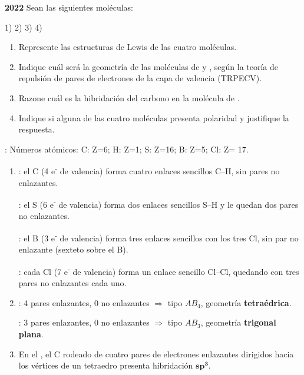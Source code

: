 \begin{exerciseEVAU}
    \textbf{2022}
    Sean las siguientes moléculas:
    \begin{center}
        1)  2)  3)  4) 
    \end{center}
    \begin{enumerate}[label=\letraminuscula]
        \item Represente las estructuras de Lewis de las cuatro moléculas.
        \item Indique cuál será la geometría de las moléculas de  y , según la teoría de repulsión
        de pares de electrones de la capa de valencia (TRPECV).
        \item Razone cuál es la hibridación del carbono en la molécula de .
        \item Indique si alguna de las cuatro moléculas presenta polaridad y justifique la respuesta.
    \end{enumerate}

    \datos{}: Números atómicos: C: Z=6; H: Z=1; S: Z=16; B: Z=5; Cl: Z= 17.

    \begin{solu}
        \begin{enumerate}[label=\letraminuscula]
            \item \textbf{}: el C (4 e\textsuperscript{-} de valencia) forma cuatro enlaces sencillos C--H, sin pares no enlazantes.

            \textbf{}: el S (6 e\textsuperscript{-} de valencia) forma dos enlaces sencillos S--H y le quedan dos pares no enlazantes.

            \textbf{}: el B (3 e\textsuperscript{-} de valencia) forma tres enlaces sencillos con los tres Cl, sin par no enlazante (sexteto sobre el B).

            \textbf{}: cada Cl (7 e\textsuperscript{-} de valencia) forma un enlace sencillo Cl--Cl, quedando con tres pares no enlazantes cada uno.

            \item \textbf{}: 4 pares enlazantes, 0 no enlazantes $\Rightarrow$ tipo \(AB_4\), geometría \textbf{tetraédrica}.

            \textbf{}: 3 pares enlazantes, 0 no enlazantes $\Rightarrow$ tipo \(AB_3\), geometría \textbf{trigonal plana}.

            \item En el , el C rodeado de cuatro pares de electrones enlazantes dirigidos hacia los vértices de un tetraedro presenta hibridación \(\bm{sp^3}\).


\end{enumerate}
\end{solu}
\end{exerciseEVAU}

